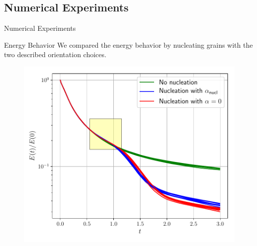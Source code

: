 \documentclass[usenames,dvipsnames]{beamer}
\begin{document}
\subsection{Numerical Experiments}

\begin{frame}{Numerical Experiments}
      \centering
\end{frame}

\begin{frame}{Energy Behavior}
We compared the energy behavior by nucleating grains with the two described orientation choices.
\begin{minipage}{0.5\textwidth}
\vspace{1em}
\begin{figure}
    \centering
    \includegraphics[scale=0.4]{figures/stored_energy/SE_energy.pdf}
\end{figure}
\end{minipage}%
\begin{minipage}{0.5\textwidth}
\vspace{1em}
\begin{figure}
    \centering

\end{figure}
\end{minipage}
\end{frame}
\end{document}
